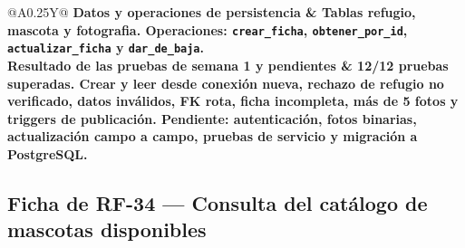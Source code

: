 \documentclass[11pt,a4paper]{article}
\newcommand{\code}[1]{\texttt{#1}}
\begin{document}
{\begin{tabularx}{\linewidth}{@{}A{0.25\linewidth}Y@{}}
\bfseries Datos y operaciones de persistencia &
Tablas \textbf{refugio}, \textbf{mascota} y \textbf{fotografia}.
Operaciones: \code{crear\_ficha}, \code{obtener\_por\_id},
\code{actualizar\_ficha} y \code{dar\_de\_baja}. \\

\bfseries Resultado de las pruebas de semana 1 y pendientes &
\textbf{12/12 pruebas superadas.} Crear y leer desde conexión nueva,
rechazo de refugio no verificado, datos inválidos, FK rota, ficha incompleta, más de 5 fotos
y triggers de publicación. Pendiente: autenticación, fotos binarias, actualización campo a
campo, pruebas de servicio y migración a PostgreSQL. \\
\bottomrule
\end{tabularx}
}

\clearpage

\subsection{Ficha de RF-34 --- Consulta del catálogo de mascotas disponibles}
\end{document}

